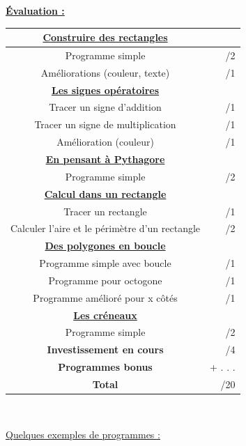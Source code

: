 \documentclass[a4paper,11pt]{article}
\begin{document}
\textbf{\underline{Évaluation : } }\\


\renewcommand{\arraystretch}{1.25} %
\setlength{\tabcolsep}{1.25cm} %

\begin{tabular}{|c|r|}
\hline 
\textbf{\underline{Construire des rectangles}} &  \\ 
\hline 
Programme simple & /2 \\ 
\hline 
Améliorations (couleur, texte) & /1 \\ 
\hline 
\textbf{\underline{Les signes opératoires} }&  \\ 
\hline 
Tracer un signe d'addition & /1 \\ 
\hline 
Tracer un signe de multiplication & /1 \\ 
\hline 
Amélioration (couleur) & /1 \\ 
\hline
\textbf{\underline{En pensant à Pythagore}} &  \\ 
\hline 
Programme simple & /2 \\ 
\hline 
\textbf{\underline{Calcul dans un rectangle}} & \\ 
\hline 
Tracer un rectangle & /1 \\ 
\hline 
Calculer l'aire et le périmètre d'un rectangle & /2 \\ 
\hline 
\textbf{\underline{Des polygones en boucle}} &  \\ 
\hline 
Programme simple avec boucle & /1 \\ 
\hline 
Programme pour octogone & /1 \\ 
\hline 
Programme amélioré pour x côtés & /1 \\ 
\hline 
\textbf{\underline{Les créneaux}} &  \\ 
\hline 
Programme simple & /2 \\ 
\hline 
\textbf{Investissement en cours} & /4 \\ 
\hline 
\textbf{Programmes bonus} & + . . . \\ 
\hline 
\textbf{Total} & /20\\ 
\hline 

\end{tabular}\\ 
\medskip

\underline{Quelques exemples de programmes :}
\end{document}
